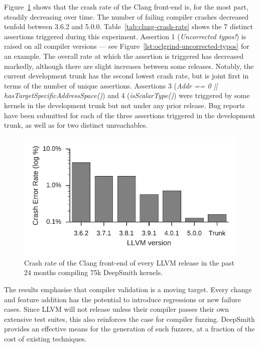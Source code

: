 Figure~\ref{fig:clang-clash-rate} shows that the crash rate of the Clang front-end is, for the most part, steadily decreasing over time. The number of failing compiler crashes decreased tenfold between 3.6.2 and 5.0.0. Table~\ref{tab:clang-crash-rate} shows the 7 distinct assertions triggered during this experiment. Assertion 1 (\emph{Uncorrected typos!}) is raised on all compiler versions --- see Figure~\ref{lst:oclgrind-uncorrected-typos} for an example. The overall rate at which the assertion is triggered has decreased markedly, although there are slight increases between some releases. Notably, the current development trunk has the second lowest crash rate, but is joint first in terms of the number of unique assertions. Assertions 3 (\emph{Addr == 0 || hasTargetSpecificAddressSpace()}) and 4 (\emph{isScalarType()}) were triggered by some kernels in the development trunk but not under any prior release. Bug reports have been submitted for each of the three assertions triggered in the development trunk, as well as for two distinct unreachables.

\begin{figure}
  \centering %
  \includegraphics[width=.85\columnwidth]{img/clang-crashes}%
  \caption[Crash rate of the Clang front-end]{%
    Crash rate of the Clang front-end of every LLVM release in the past 24 months compiling 75k DeepSmith kernels.%
  }%
  \label{fig:clang-clash-rate}
\end{figure}

\begin{table}
  \centering %
  
  \caption[Number of DeepSmith programs which trigger errors]{%
    The number of DeepSmith programs which trigger distinct Clang front-end assertions, and the number of programs which trigger unreachables.%
  }
  \label{tab:clang-crash-rate}
\end{table}

The results emphasise that compiler validation is a moving target. Every change and feature addition has the potential to introduce regressions or new failure cases. Since LLVM will not release unless their compiler passes their own extensive test suites, this also reinforces the case for compiler fuzzing. DeepSmith provides an effective means for the generation of such fuzzers, at a fraction of the cost of existing techniques.



